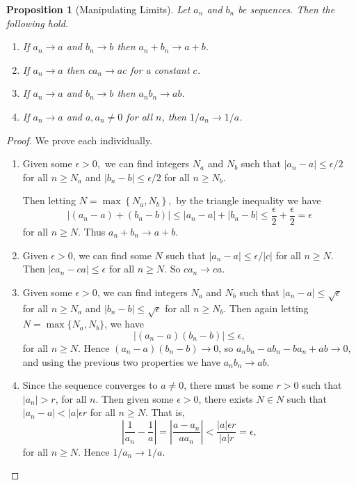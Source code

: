 \documentclass[11pt, a4paper]{article}
\newtheorem{proposition}[theorem]{Proposition}
\theoremstyle{definition}
\begin{document}
\begin{proposition}[Manipulating Limits]
	\label{prop:manipulating}
	Let $a_n$ and $b_n$ be sequences. Then the following hold.
	\begin{enumerate}[label=(\roman*)]
		\item If $a_n \rightarrow a$ and $b_n \rightarrow b$ then $a_n + b_n \rightarrow a + b$.
		\item If $a_n \rightarrow a$ then $c a_n \rightarrow ac$ for a constant $c$.
		\item If $a_n \rightarrow a$ and $b_n \rightarrow b$ then $a_n b_n \rightarrow a b$.
		\item If $a_n \rightarrow a$ and $a, a_n \neq 0$ for all $n$, then $1/a_n \rightarrow 1/a$.
	\end{enumerate}
\end{proposition}
\begin{proof}
	We prove each individually.
	\begin{enumerate}[label=(\roman*)]
		\item Given some $\epsilon>0,$ we can find integers $N_{a}$ and $N_{b}$ such that $|a_n - a| \leq \epsilon/2$ for all $n \geq N_a$ and $|b_n - b| \leq \epsilon/2$ for all $n \geq N_b$.
		
		Then letting $N=\max \left\{N_{a}, N_{b}\right\},$ by the triangle inequality we have
		$$
			\left|\left(a_{n}-a\right)+\left(b_{n}-b\right)\right| \leq\left|a_{n}-a\right|+\left|b_{n}-b\right|
			\leq \frac{\epsilon}{2}+\frac{\epsilon}{2}=\epsilon
		$$
		for all $n \geq N$. Thus $a_{n}+b_{n} \rightarrow a+b$.
		\item Given $\epsilon > 0$, we can find some $N$ such that
		$|a_n - a| \leq \epsilon/|c|$ for all $n \geq N$. Then $|ca_n - ca| \leq \epsilon$ for all $n \geq N$. So $c a_n \rightarrow c a$.
		\item Given some $\epsilon > 0$, we can find integers $N_a$ and $N_b$ such that $|a_n - a| \leq \sqrt{\epsilon}$ for all $n \geq N_a$ and $|b_n - b| \leq \sqrt{\epsilon}$ for all $n \geq N_b$. Then again letting $N = \max\{N_a, N_b\}$, we have
		$$
			|(a_n - a)(b_n - b)| \leq \epsilon,
		$$
		for all $n \geq N$.
		Hence $(a_n - a)(b_n - b) \rightarrow 0$, so $a_n b_n - a b_n - b a_n + ab \rightarrow 0$, and using the previous two properties we have $a_n b_n \rightarrow ab$.
		\item Since the sequence converges to $a \neq 0$, there must be some $r>0$ such that $|a_n|>r$, for all $n$.
		Then given some $\epsilon > 0$, there exists $N \in N$ such that $|a_n - a| < |a|\epsilon r$ for all $n \geq N$. That is,
		$$
		\left|\frac{1}{a_n} - \frac{1}{a}\right|=\left|\frac{a - a_n}{a a_n}\right| < \frac{|a|\epsilon r}{|a|r} = \epsilon,
		$$
		for all $n \geq N$.
		Hence $1/a_n \rightarrow 1/a$. \qedhere
	\end{enumerate}
\end{proof}
\end{document}
